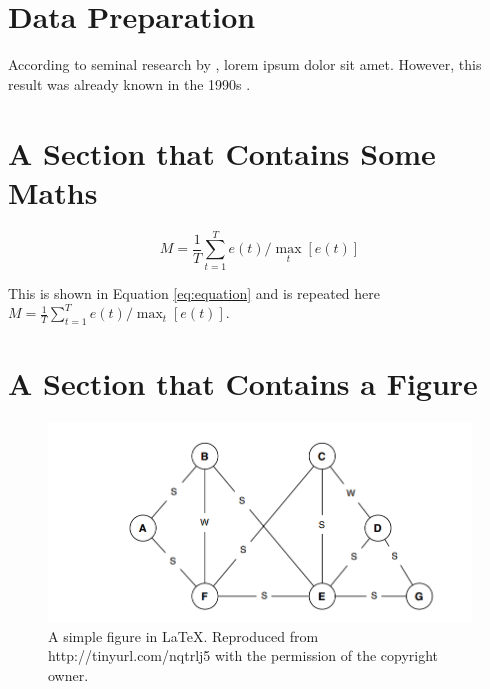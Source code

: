 \newpage
\section{Data Preparation}

According to seminal research by \cite{Reference1}, lorem ipsum dolor sit amet.  However, this result was already known in the 1990s \citep{Reference2,Reference3}.  %


\section{A Section that Contains Some Maths}

\lipsum  %
 
\begin{equation}
M = \frac{1}{T}\sum_{t=1}^{T} e(t) / \max_{t}[e(t)]
\label{eq:equation}
\end{equation}

\lipsum  %

This is shown in Equation \ref{eq:equation} and is repeated here $M = \frac{1}{T}\sum_{t=1}^{T} e(t) / \max_{t}[e(t)]$.


\section{A Section that Contains a Figure}

\lipsum  %

\begin{figure}[ht]
\includegraphics[width=15cm]{figures/figure1.png}
\caption{A simple figure in \LaTeX. Reproduced from http://tinyurl.com/nqtrlj5 with the permission of the copyright owner.}
\label{fig:graph}
\end{figure}

\lipsum  %

